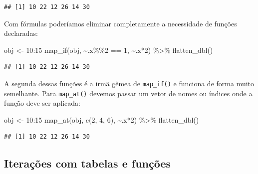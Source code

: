 \documentclass[
]{book}
\newenvironment{Shaded}{\begin{snugshade}}{\end{snugshade}}
\newcommand{\DecValTok}[1]{\textcolor[rgb]{0.00,0.00,0.81}{#1}}
\newcommand{\FunctionTok}[1]{\textcolor[rgb]{0.00,0.00,0.00}{#1}}
\newcommand{\NormalTok}[1]{#1}
\newcommand{\OtherTok}[1]{\textcolor[rgb]{0.56,0.35,0.01}{#1}}
\newcommand{\SpecialCharTok}[1]{\textcolor[rgb]{0.00,0.00,0.00}{#1}}
\begin{document}
\begin{verbatim}
## [1] 10 22 12 26 14 30
\end{verbatim}

Com fórmulas poderíamos eliminar completamente a necessidade de funções
declaradas:

\begin{Shaded}
\begin{Highlighting}[]
\NormalTok{obj }\OtherTok{\textless{}{-}} \DecValTok{10}\SpecialCharTok{:}\DecValTok{15}
\FunctionTok{map\_if}\NormalTok{(obj, }\SpecialCharTok{\textasciitilde{}}\NormalTok{.x}\SpecialCharTok{\%\%}\DecValTok{2} \SpecialCharTok{==} \DecValTok{1}\NormalTok{, }\SpecialCharTok{\textasciitilde{}}\NormalTok{.x}\SpecialCharTok{*}\DecValTok{2}\NormalTok{) }\SpecialCharTok{\%\textgreater{}\%} \FunctionTok{flatten\_dbl}\NormalTok{()}
\end{Highlighting}
\end{Shaded}

\begin{verbatim}
## [1] 10 22 12 26 14 30
\end{verbatim}

A segunda dessas funções é a irmã gêmea de \texttt{map\_if()} e funciona de forma muito
semelhante. Para \texttt{map\_at()} devemos passar um vetor de nomes ou índices onde a
função deve ser aplicada:

\begin{Shaded}
\begin{Highlighting}[]
\NormalTok{obj }\OtherTok{\textless{}{-}} \DecValTok{10}\SpecialCharTok{:}\DecValTok{15}
\FunctionTok{map\_at}\NormalTok{(obj, }\FunctionTok{c}\NormalTok{(}\DecValTok{2}\NormalTok{, }\DecValTok{4}\NormalTok{, }\DecValTok{6}\NormalTok{), }\SpecialCharTok{\textasciitilde{}}\NormalTok{.x}\SpecialCharTok{*}\DecValTok{2}\NormalTok{) }\SpecialCharTok{\%\textgreater{}\%} \FunctionTok{flatten\_dbl}\NormalTok{()}
\end{Highlighting}
\end{Shaded}

\begin{verbatim}
## [1] 10 22 12 26 14 30
\end{verbatim}

\hypertarget{iterauxe7uxf5es-com-tabelas-e-funuxe7uxf5es}{%
\subsection{Iterações com tabelas e funções}\label{iterauxe7uxf5es-com-tabelas-e-funuxe7uxf5es}}
\end{document}
